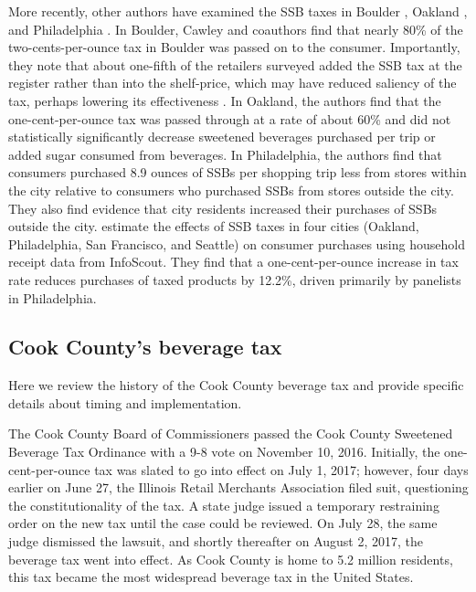 \documentclass[12pt]{article}
\begin{document}
More recently, other authors have examined the SSB taxes in Boulder \parencite{cawley2021boulder}, Oakland \parencite{cawley2020oakland}, and Philadelphia \parencite{cawley2020philly}. In Boulder, Cawley and coauthors find that nearly 80\% of the two-cents-per-ounce tax in Boulder was passed on to the consumer. Importantly, they note that about one-fifth of the retailers surveyed added the SSB tax at the register rather than into the shelf-price, which may have reduced saliency of the tax, perhaps lowering its effectiveness \parencite{chetty2009salience}. In Oakland, the authors find that the one-cent-per-ounce tax was passed through at a rate of about 60\% and did not statistically significantly decrease sweetened beverages purchased per trip or added sugar consumed from beverages. In Philadelphia, the authors find that consumers purchased 8.9 ounces of SSBs per shopping trip less from stores within the city relative to consumers who purchased SSBs from stores outside the city. They also find evidence that city residents increased their purchases of SSBs outside the city. \textcite{cawley2020impact} estimate the effects of SSB taxes in four cities (Oakland, Philadelphia, San Francisco, and Seattle) on consumer purchases using household receipt data from InfoScout. They find that a one-cent-per-ounce increase in tax rate reduces purchases of taxed products by 12.2\%, driven primarily by panelists in Philadelphia.

\subsection{Cook County's beverage tax}

Here we review the history of the Cook County beverage tax and provide specific details about timing and implementation.

The Cook County Board of Commissioners passed the Cook County Sweetened Beverage Tax Ordinance with a 9-8 vote on November 10, 2016. Initially, the one-cent-per-ounce tax was slated to go into effect on July 1, 2017; however, four days earlier on June 27, the Illinois Retail Merchants Association filed suit, questioning the constitutionality of the tax. A state judge issued a temporary restraining order on the new tax until the case could be reviewed. On July 28, the same judge dismissed the lawsuit, and shortly thereafter on August 2, 2017, the beverage tax went into effect. As Cook County is home to 5.2 million residents, this tax became the most widespread beverage tax in the United States.
\end{document}
